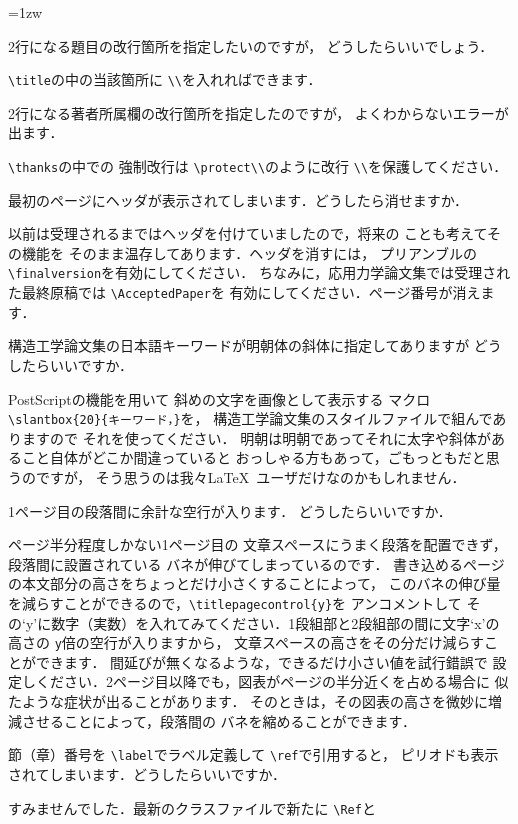 \documentclass[dvipdfmx,onecolumn]{jsce}  %
\begin{document}
\def\Qitem{\def\labelenumi{\bf Q.\theenumi:}\item}
\def\Aitem{\addtocounter{enumi}{-1}\def\labelenumi{\bf A.\theenumi:}\item}
\begin{Enumerate}
\parindent=1zw
\Qitem 2行になる題目の改行箇所を指定したいのですが，
どうしたらいいでしょう．
\Aitem \verb+\title+の中の当該箇所に \verb+\\+を入れればできます．
%
\Qitem 2行になる著者所属欄の改行箇所を指定したのですが，
よくわからないエラーが出ます．
\Aitem \verb+\thanks+の中での
強制改行は \verb+\protect\\+のように改行 \verb+\\+を保護してください．
%
\Qitem 最初のページにヘッダが表示されてしまいます．どうしたら消せますか．
\Aitem 以前は受理されるまではヘッダを付けていましたので，将来の
ことも考えてその機能を
そのまま温存してあります．ヘッダを消すには，
プリアンブルの \verb+\finalversion+を有効にしてください．
ちなみに，応用力学論文集では受理された最終原稿では \verb+\AcceptedPaper+を
有効にしてください．ページ番号が消えます．
%
\Qitem 構造工学論文集の日本語キーワードが明朝体の斜体に指定してありますが
どうしたらいいですか．
\Aitem PostScriptの機能を用いて
斜めの文字を画像として表示する
マクロ \verb+\slantbox{20}{キーワード，}+を，
構造工学論文集のスタイルファイルで組んでありますので
それを使ってください．
明朝は明朝であってそれに太字や斜体があること自体がどこか間違っていると
おっしゃる方もあって，ごもっともだと思うのですが，
そう思うのは我々\LaTeX\ ユーザだけなのかもしれません．
%
\Qitem 1ページ目の段落間に余計な空行が入ります．
どうしたらいいですか．\label{item:titlepagecontrol}
\Aitem ページ半分程度しかない1ページ目の
文章スペースにうまく段落を配置できず，段落間に設置されている
バネが伸びてしまっているのです．
書き込めるページの本文部分の高さをちょっとだけ小さくすることによって，
このバネの伸び量を減らすことができるので，\verb+\titlepagecontrol{y}+を
アンコメントして
その`y'に数字（実数）を入れてみてください．1段組部と2段組部の間に文字`x'の
高さの \verb+y+倍の空行が入りますから，
文章スペースの高さをその分だけ減らすことができます．
間延びが無くなるような，できるだけ小さい値を試行錯誤で
設定しください．2ページ目以降でも，図表がページの半分近くを占める場合に
似たような症状が出ることがあります．
そのときは，その図表の高さを微妙に増減させることによって，段落間の
バネを縮めることができます．
%
\Qitem 節（章）番号を \verb+\label+でラベル定義して \verb+\ref+で引用すると，
ピリオドも表示されてしまいます．どうしたらいいですか．
\Aitem すみませんでした．最新のクラスファイルで新たに \verb+\Ref+と

\end{Enumerate}
\end{document}
